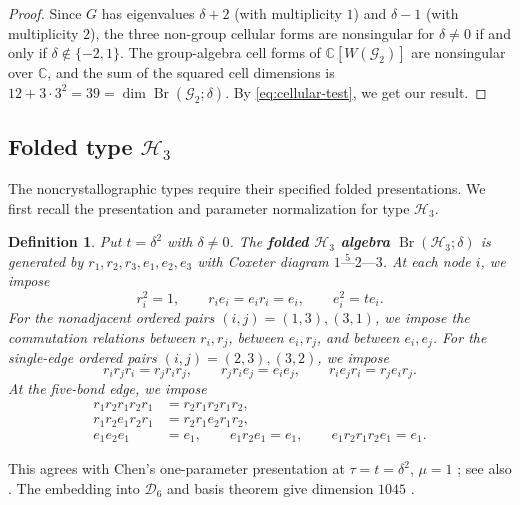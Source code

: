 \documentclass[11pt,a4paper]{amsart}
\newcommand{\Br}{\operatorname{Br}}\newcommand{\Irr}{\operatorname{Irr}}
\theoremstyle{uprightdefinition}
\newtheorem{definition}[theorem]{Definition}
\theoremstyle{remark}\newtheorem{remark}[theorem]{Remark}
\begin{document}
\begin{proof}
Since $G$ has eigenvalues $\delta+2$ (with multiplicity $1$) and $\delta-1$ (with multiplicity $2$),
the three non-group cellular forms are nonsingular for $\delta\ne0$ if and only if
$\delta\notin\{-2,1\}$. The group-algebra cell forms of $\mathbb C[W(\mathscr{G}_2)]$ are nonsingular over
$\mathbb C$, and the sum of the squared cell dimensions is
$12+3\cdot3^2=39=\dim\Br(\mathscr{G}_2;\delta)$. By \eqref{eq:cellular-test}, we get our result.
\end{proof}

\subsection{Folded type \texorpdfstring{$\mathscr{H}_3$}{H3}}
\label{subsec:type-H3}
\label{app:h3}
The noncrystallographic types require their specified folded
presentations. We first recall the presentation and parameter
normalization for type $\mathscr{H}_3$.

\begin{definition}\label{def:h3-model}
\cite[Definition~2.1]{Liu2016}
Put $t=\delta^2$ with $\delta\ne0$. The \textbf{folded $\mathscr{H}_3$ algebra}
$\Br(\mathscr{H}_3;\delta)$ is generated by
$r_1,r_2,r_3,e_1,e_2,e_3$ with Coxeter diagram
$1\stackrel{5}{\text{---}}2\text{---}3$.
At each node $i$, we impose
\[
 r_i^2=1,\qquad r_ie_i=e_ir_i=e_i,\qquad e_i^2=t e_i.
\]
For the nonadjacent ordered pairs $(i,j)=(1,3),(3,1)$, we impose the
commutation relations between $r_i,r_j$, between $e_i,r_j$, and between $e_i,e_j$.
For the single-edge ordered pairs $(i,j)=(2,3),(3,2)$, we impose
\[
 r_ir_jr_i=r_jr_ir_j,\qquad
 r_jr_ie_j=e_ie_j,\qquad r_ie_jr_i=r_je_ir_j.
\]
At the five-bond edge, we impose
\begin{align*}
 r_1r_2r_1r_2r_1&=r_2r_1r_2r_1r_2,\\
 r_1r_2e_1r_2r_1&=r_2r_1e_2r_1r_2,\\
 e_1e_2e_1&=e_1,\qquad
 e_1r_2e_1=e_1,\qquad
 e_1r_2r_1r_2e_1=e_1.
\end{align*}
\end{definition}

This agrees with Chen's one-parameter presentation at
$\tau=t=\delta^2$, $\mu=1$
\cite[Definition~8.2 and Theorem~8.4]{Chen2012}; see also
\cite[Remark~5.4]{Liu2016}. The embedding into $\mathscr{D}_6$ and basis theorem
give dimension $1045$ \cite[Theorem~1.1]{Liu2016}.
\end{document}
